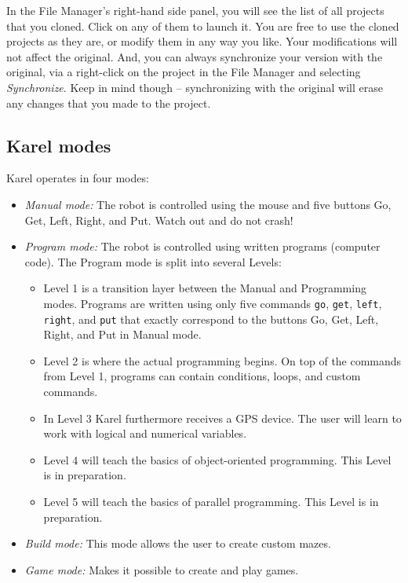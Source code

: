 \documentclass[article,A4,12pt]{llncs}
\begin{document}
In the File Manager's right-hand side panel, you will see the list of all 
projects that you cloned. Click on any of them to launch it. You are free to 
use the cloned projects as they are, or modify them in any way you like. Your 
modifications will not affect the original. And, you can 
always synchronize your version with the original, via 
a right-click on the project in the File Manager and selecting {\em Synchronize}.
Keep in mind though -- synchronizing with the original will erase any changes that 
you made to the project.

\subsection{Karel modes} \label{levels}

Karel operates in four modes:
\begin{itemize}
\item {\em Manual mode:} The robot is controlled using the mouse and five buttons Go, Get, Left, Right, and Put. 
      Watch out and do not crash!
\item {\em Program mode:} The robot is controlled using written programs (computer code). The Program mode is 
      split into several Levels:
\begin{itemize}
\item Level 1 is a transition layer between the Manual and Programming modes. Programs are written using only 
      five commands {\tt go}, {\tt get}, {\tt left}, {\tt right}, and {\tt put} that exactly correspond to 
      the buttons Go, Get, Left, Right, and Put in Manual mode.
\item Level 2 is where the actual programming begins. On top of the commands from Level 1, programs can contain 
      conditions, loops, and custom commands.
\item In Level 3 Karel furthermore receives a GPS device. The user will learn to work with logical 
      and numerical variables. 
\item Level 4 will teach the basics of object-oriented programming. This Level is in preparation.
\item Level 5 will teach the basics of parallel programming. This Level is in preparation.
\end{itemize}
\item {\em Build mode:} This mode allows the user to create custom mazes.
\item {\em Game mode:} Makes it possible to create and play games. 
\end{itemize}
\end{document}
